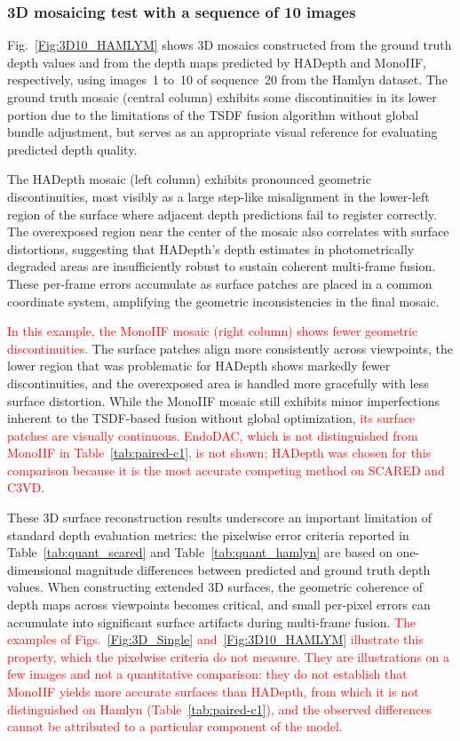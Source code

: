 \documentclass[a4paper,fleqn]{cas-dc}
\begin{document}
\subsubsection*{3D mosaicing test with a sequence of 
10 images}
Fig.~\ref{Fig:3D10_HAMLYM} shows 3D mosaics constructed from the ground truth depth values and from the depth maps predicted by HADepth and MonoIIF, respectively, using images~1 to~10 of sequence~20 from the Hamlyn dataset. The ground truth mosaic (central column) exhibits some discontinuities in its lower portion due to the limitations of the TSDF fusion algorithm without global bundle adjustment, but serves as an appropriate visual reference for evaluating predicted depth quality.

The HADepth mosaic (left column) exhibits pronounced geometric discontinuities, most visibly as a large step-like misalignment in the lower-left region of the surface where adjacent depth predictions fail to register correctly. The overexposed region near the center of the mosaic also correlates with surface distortions, suggesting that HADepth's depth estimates in photometrically degraded areas are insufficiently robust to sustain coherent multi-frame fusion. These per-frame errors accumulate as surface patches are placed in a common coordinate system, amplifying the geometric inconsistencies in the final mosaic.

\textcolor{red}{In this example, the MonoIIF mosaic (right column) shows fewer geometric discontinuities.} The surface patches align more consistently across viewpoints, the lower region that was problematic for HADepth shows markedly fewer discontinuities, and the overexposed area is handled more gracefully with less surface distortion. While the MonoIIF mosaic 
still exhibits minor imperfections inherent to the TSDF-based fusion without global optimization, \textcolor{red}{its surface patches are visually continuous. EndoDAC, which is not distinguished from MonoIIF in Table~\ref{tab:paired-c1}, is not shown; HADepth was chosen for this comparison because it is the most accurate competing method on SCARED and C3VD.}

These 3D surface reconstruction results underscore an important limitation of standard depth evaluation metrics: the pixelwise error criteria reported in Table~\ref{tab:quant_scared} and Table~\ref{tab:quant_hamlyn} are based on one-dimensional magnitude differences between predicted and ground truth depth values. 
When constructing extended 3D surfaces, the geometric coherence of depth maps across viewpoints becomes critical, and small per-pixel errors can accumulate into significant surface artifacts during multi-frame fusion. \textcolor{red}{The examples of Figs.~\ref{Fig:3D_Single} and~\ref{Fig:3D10_HAMLYM} illustrate this property, which the pixelwise criteria do not measure. They are illustrations on a few images and not a quantitative comparison: they do not establish that MonoIIF yields more accurate surfaces than HADepth, from which it is not distinguished on Hamlyn (Table~\ref{tab:paired-c1}), and the observed differences cannot be attributed to a particular component of the model.}
%
\end{document}
